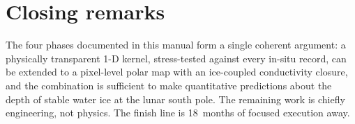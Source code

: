 \section{Closing remarks}

The four phases documented in this manual form a single coherent
argument: a physically transparent 1-D kernel, stress-tested against
every in-situ record, can be extended to a pixel-level polar map
with an ice-coupled conductivity closure, and the combination is
sufficient to make quantitative predictions about the depth of
stable water ice at the lunar south pole.  The remaining work is
chiefly engineering, not physics.  The finish line is \num{18}~months
of focused execution away.
